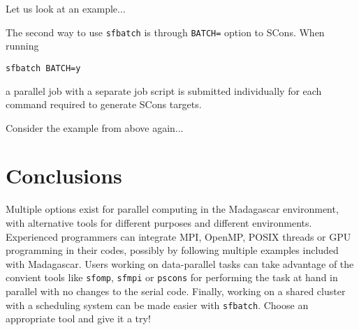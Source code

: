 Let us look at an example...

The second way to use \texttt{sfbatch} is through \texttt{BATCH=} option to SCons. When running
\begin{verbatim}
sfbatch BATCH=y
\end{verbatim}
a parallel job with a separate job script is submitted individually
for each command required to generate SCons targets.

Consider the example from above again...

\section{Conclusions}

Multiple options exist for parallel computing in the Madagascar
environment, with alternative tools for different purposes and
different environments. Experienced programmers can integrate MPI,
OpenMP, POSIX threads or GPU programming in their codes, possibly by
following multiple examples included with Madagascar. Users working on
data-parallel tasks can take advantage of the convient tools like
\texttt{sfomp}, \texttt{sfmpi} or \texttt{pscons} for performing the
task at hand in parallel with no changes to the serial code. Finally,
working on a shared cluster with a scheduling system can be made
easier with \texttt{sfbatch}. Choose an appropriate tool and give it a try!




